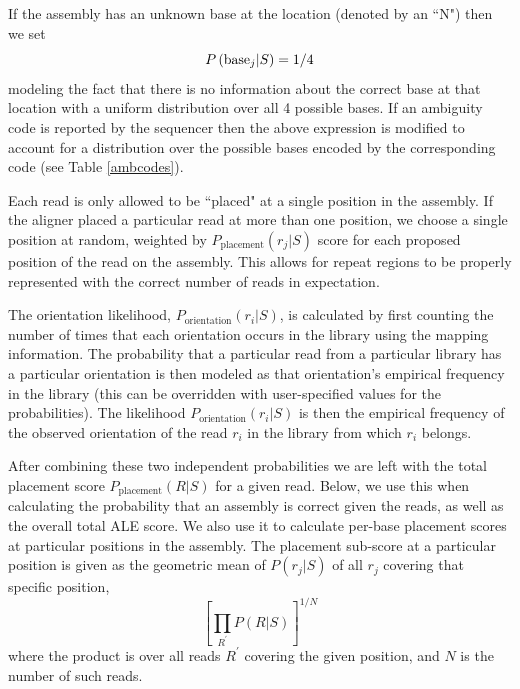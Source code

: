 \documentclass[phd,tocprelim]{cornell}
\begin{document}
If the assembly has an unknown base at the location (denoted by an ``N") then we set
\begin{equation}
    P\left({\rm base}_{j}|S\right) = 1/4
\end{equation}
modeling the fact that there is no information about the correct base at that location with a uniform distribution over all 4 possible bases. If an ambiguity code is reported by the sequencer then the above expression is modified to account for a distribution over the possible bases encoded by the corresponding code (see Table \ref{ambcodes}).

Each read is only allowed to be ``placed" at a single position in the assembly. If the aligner placed a particular read at more than one position, we choose a single position at random, weighted by $P_{\text{placement}}(r_{j}|S)$ score for each proposed position of the read on the assembly. This allows for repeat regions to be properly represented with the correct number of reads in expectation.

The orientation likelihood, $P_{\text{orientation}}\left(r_{i}|S\right)$, is calculated by first counting the number of times that each orientation occurs in the library using the mapping information.  The probability that a particular read from a particular library has a particular orientation is then modeled as that orientation's empirical frequency in the library (this can be overridden with user-specified values for the probabilities).  The likelihood $P_{\text{orientation}}\left(r_{i}|S\right)$ is then the empirical frequency of the observed orientation of the read $r_{i}$ in the library from which $r_{i}$ belongs.

After combining these two independent probabilities we are left with the total placement score $P_{\text{placement}}(R|S)$ for a given read.  Below, we use this when calculating the probability that an assembly is correct given the reads, as well as the overall total ALE score.  We also use it to calculate per-base placement scores at particular positions in the assembly.  The placement sub-score at a particular position is given as the geometric mean of $P(r_{j}|S)$ of all $r_{j}$ covering that specific position,
\begin{equation}
    \left[\prod_{R^{\prime}}P(R|S)\right]^{1/N}
\end{equation}
where the product is over all reads $R^{\prime}$ covering the given position, and $N$ is the number of such reads.

\end{document}

